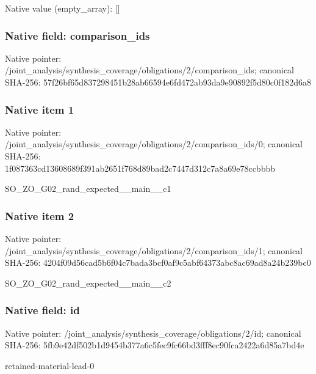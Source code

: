 \documentclass[10pt,a4paper]{article}
\begin{document}
Native value (empty\_\allowbreak{}array): []

\subsubsection{Native field: comparison\_\allowbreak{}ids}
Native pointer: /joint\_\allowbreak{}analysis/synthesis\_\allowbreak{}coverage/obligations/2/comparison\_\allowbreak{}ids; canonical SHA-256: 57f26bf65d837298451b28ab66594e6fd472ab93da9e90892f5d80c0f182d6a8

\subsubsection{Native item 1}
Native pointer: /joint\_\allowbreak{}analysis/synthesis\_\allowbreak{}coverage/obligations/2/comparison\_\allowbreak{}ids/0; canonical SHA-256: 1f087363cd13608689f391ab2651f768d89bad2c7447d312c7a8a69e78ccbbbb

\begingroup\raggedright\sloppy SO\_\allowbreak{}ZO\_\allowbreak{}G02\_\allowbreak{}rand\_\allowbreak{}expected\_\allowbreak{}\_\allowbreak{}main\_\allowbreak{}\_\allowbreak{}c1\par\endgroup

\subsubsection{Native item 2}
Native pointer: /joint\_\allowbreak{}analysis/synthesis\_\allowbreak{}coverage/obligations/2/comparison\_\allowbreak{}ids/1; canonical SHA-256: 4204f09d56cad5b6f04c7bada3bcf0af9c5abf64373abc8ac69ad8a24b239bc0

\begingroup\raggedright\sloppy SO\_\allowbreak{}ZO\_\allowbreak{}G02\_\allowbreak{}rand\_\allowbreak{}expected\_\allowbreak{}\_\allowbreak{}main\_\allowbreak{}\_\allowbreak{}c2\par\endgroup

\subsubsection{Native field: id}
Native pointer: /joint\_\allowbreak{}analysis/synthesis\_\allowbreak{}coverage/obligations/2/id; canonical SHA-256: 5fb9e42df502b1d9454b377a6c5fec9fc66bd3fff8ec90fca2422a6d85a7bd4e

\begingroup\raggedright\sloppy retained-material-lead-0\par\endgroup
\end{document}
